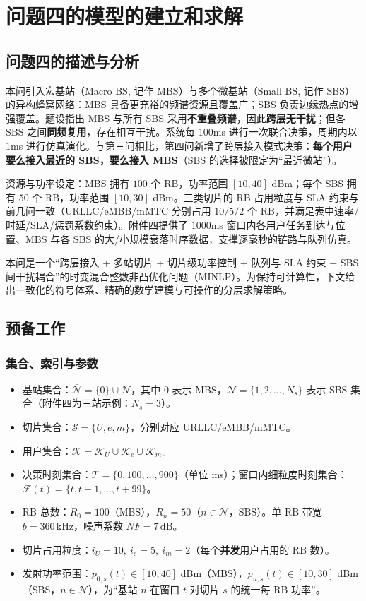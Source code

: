 \section{问题四的模型的建立和求解}
\subsection{问题四的描述与分析}

本问引入宏基站（Macro BS, 记作 MBS）与多个微基站（Small BS, 记作 SBS）的异构蜂窝网络：MBS 具备更充裕的频谱资源且覆盖广；SBS 负责边缘热点的增强覆盖。题设指出 MBS 与所有 SBS 采用\textbf{不重叠频谱}，因此\textbf{跨层无干扰}；但各 SBS 之间\textbf{同频复用}，存在相互干扰。系统每 $100$ms 进行一次联合决策，周期内以 $1$ms 进行仿真演化。与第三问相比，第四问新增了跨层接入模式决策：\textbf{每个用户要么接入最近的 SBS，要么接入 MBS}（SBS 的选择被限定为“最近微站”）。

资源与功率设定：MBS 拥有 $100$ 个 RB，功率范围 $[10,40]$ dBm；每个 SBS 拥有 $50$ 个 RB，功率范围 $[10,30]$ dBm。三类切片的 RB 占用粒度与 SLA 约束与前几问一致（URLLC/eMBB/mMTC 分别占用 $10/5/2$ 个 RB，并满足表中速率/时延/SLA/惩罚系数约束）。附件四提供了 $1000$ms 窗口内各用户任务到达与位置、MBS 与各 SBS 的大/小规模衰落时序数据，支撑逐毫秒的链路与队列仿真。

本问是一个“跨层接入 + 多站切片 + 切片级功率控制 + 队列与 SLA 约束 + SBS 间干扰耦合”的时变混合整数非凸优化问题（MINLP）。为保持可计算性，下文给出一致化的符号体系、精确的数学建模与可操作的分层求解策略。

\subsection{预备工作}

\subsubsection{集合、索引与参数}

\begin{itemize}
  \item 基站集合：$\bar{\mathcal{N}}=\{0\}\cup\mathcal{N}$，其中 $0$ 表示 MBS，$\mathcal{N}=\{1,2,\dots,N_s\}$ 表示 SBS 集合（附件四为三站示例：$N_s=3$）。
  \item 切片集合：$\mathcal{S}=\{U,e,m\}$，分别对应 URLLC/eMBB/mMTC。
  \item 用户集合：$\mathcal{K}=\mathcal{K}_U\cup\mathcal{K}_e\cup\mathcal{K}_m$。
  \item 决策时刻集合：$\mathcal{T}=\{0,100,\dots,900\}$（单位 ms）；窗口内细粒度时刻集合：$\mathcal{F}(t)=\{t,t+1,\dots,t+99\}$。
  \item RB 总数：$R_0=100$（MBS），$R_n=50$（$n\in\mathcal{N}$，SBS）。单 RB 带宽 $b=360\,\mathrm{kHz}$，噪声系数 $NF=7\,\mathrm{dB}$。
  \item 切片占用粒度：$i_U=10,\ i_e=5,\ i_m=2$（每个\textbf{并发}用户占用的 RB 数）。
  \item 发射功率范围：$p_{0,s}(t)\in[10,40]$ dBm（MBS），$p_{n,s}(t)\in[10,30]$ dBm（SBS，$n\in\mathcal{N}$），为“基站 $n$ 在窗口 $t$ 对切片 $s$ 的统一每 RB 功率”。
\end{itemize}

